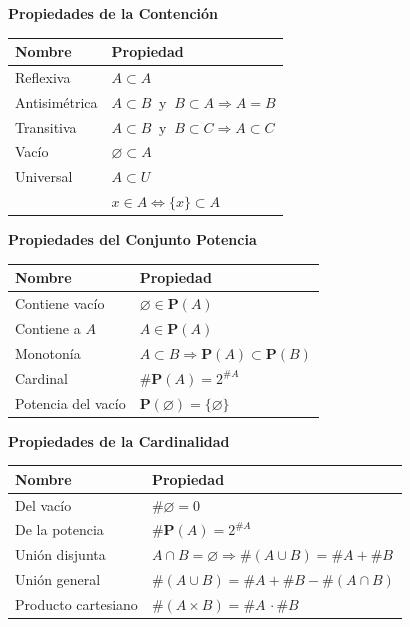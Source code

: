 \documentclass[12pt]{article}
\begin{document}
\bigskip

\newpage
{\large\bfseries Propiedades de la Contención}

\begin{tabularx}{\linewidth}{@{}lX@{}}
\toprule
\textbf{Nombre} & \textbf{Propiedad} \\ \midrule
Reflexiva     & $A \subset A$ \\
Antisimétrica & $A\subset B \ \text{ y }\ B\subset A \Rightarrow A=B$ \\
Transitiva    & $A\subset B \ \text{ y }\ B\subset C \Rightarrow A\subset C$ \\
Vacío         & $\varnothing \subset A$ \\
Universal     & $A \subset U$ \\
& $x\in A \Longleftrightarrow \{x\}\subset A$\\
\bottomrule
\end{tabularx}

\bigskip

{\large\bfseries Propiedades del Conjunto Potencia}

\begin{tabularx}{\linewidth}{@{}lX@{}}
\toprule
\textbf{Nombre} & \textbf{Propiedad} \\ \midrule
Contiene vacío   & $\varnothing \in \mathbf P(A)$ \\
Contiene a $A$   & $A \in \mathbf P(A)$ \\
Monotonía        & $A \subset B \Rightarrow \mathbf P(A)\subset\mathbf P(B)$ \\
Cardinal         & $\#\mathbf P(A) = 2^{\#A}$ \\
Potencia del vacío & $\mathbf P(\varnothing)=\{\varnothing\}$ \\
\bottomrule
\end{tabularx}

\bigskip

{\large\bfseries Propiedades de la Cardinalidad}

\begin{tabularx}{\linewidth}{@{}lX@{}}
\toprule
\textbf{Nombre} & \textbf{Propiedad} \\ \midrule
Del vacío           & $\#\varnothing=0$ \\
De la potencia        & $\#\mathbf P(A) = 2^{\#A}$ \\
Unión disjunta      & $A\cap B=\varnothing \Rightarrow \#(A\cup B)=\#A+\#B$ \\
Unión general       & $\#(A\cup B) = \#A + \#B - \#(A\cap B)$ \\
Producto cartesiano & $\#(A\times B) = \#A\,\cdot\#B$ \\
\bottomrule
\end{tabularx}
\end{document}
